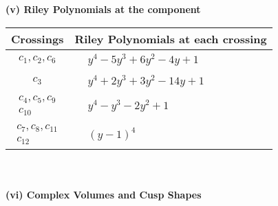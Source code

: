 \documentclass[1p]{elsarticle_modified}
\theoremstyle{definition}
\begin{document}
\newpage\renewcommand{\arraystretch}{1}
\flushleft \textbf{(v) Riley Polynomials at the component}\newline \\
\begin{tabular}{m{50pt}|m{274pt}}
Crossings & \hspace{64pt}Riley Polynomials at each crossing \\
\hline $$\begin{aligned}c_{1},c_{2},c_{6}\end{aligned}$$&$\begin{aligned}
&y^4-5 y^3+6 y^2-4 y+1
\end{aligned}$\\
\hline $$\begin{aligned}c_{3}\end{aligned}$$&$\begin{aligned}
&y^4+2 y^3+3 y^2-14 y+1
\end{aligned}$\\
\hline $$\begin{aligned}c_{4},c_{5},c_{9}\\c_{10}\end{aligned}$$&$\begin{aligned}
&y^4- y^3-2 y^2+1
\end{aligned}$\\
\hline $$\begin{aligned}c_{7},c_{8},c_{11}\\c_{12}\end{aligned}$$&$\begin{aligned}
&(y-1)^4
\end{aligned}$\\
\hline
\end{tabular}\\~\\
\newpage\flushleft \textbf{(vi) Complex Volumes and Cusp Shapes}
\end{document}
